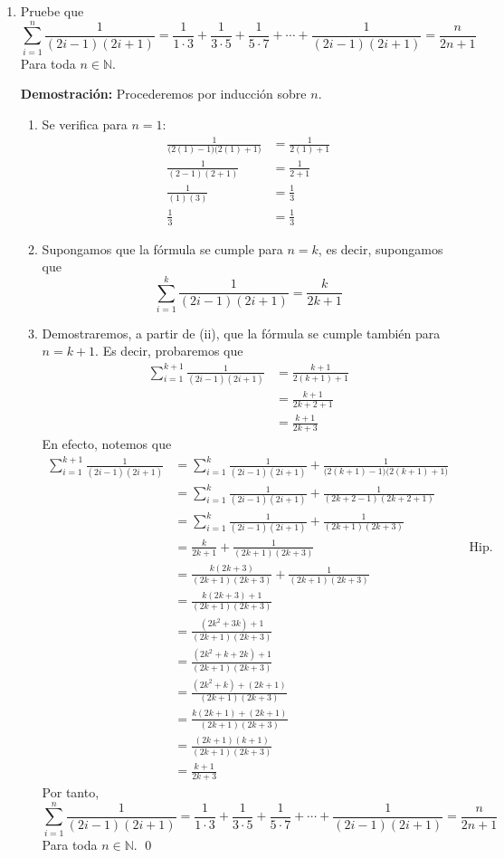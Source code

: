 \documentclass[11pt]{article}
\newcommand{\N}{\mathbb{N}}
\begin{document}
\begin{enumerate}
 \item Pruebe que \[ \sum_{i=1}^n \frac{1}{(2i-1)(2i+1)} = \frac{1}{1\cdot 3}+\frac{1}{3\cdot 5}+\frac{1}{5\cdot 7} + \cdots + \frac{1}{(2i-1)(2i+1)} = \frac{n}{2n+1}
  \] Para toda $n\in \N$.

  \textbf{Demostración:} Procederemos por inducción sobre $n$. \begin{enumerate}[label=\roman*)]
   \item Se verifica para $n=1$: \begin{align*}
   \frac{1}{\bigl(2(1)-1\bigr)\bigl(2(1)+1\bigr)} &= \frac{1}{2(1)+1}\\
   \frac{1}{(2-1)(2+1)} &=  \frac{1}{2+1}\\
   \frac{1}{(1)(3)} &= \frac{1}{3} \\
   \frac{1}{3} &= \frac{1}{3}
   \end{align*}
   \item Supongamos que la fórmula se cumple para $n=k$, es decir, supongamos que \[
    \sum_{i=1}^k \frac{1}{(2i-1)(2i+1)} = \frac{k}{2k+1}
    \]
   \item Demostraremos, a partir de (ii), que la fórmula se cumple también para $n=k+1$. Es decir, probaremos que \begin{align*}
    \sum_{i=1}^{k+1}\frac{1}{(2i-1)(2i+1)} &= \frac{k+1}{2(k+1)+1}\\
    &= \frac{k+1}{2k+2+1}\\
    &= \frac{k+1}{2k+3}
   \end{align*}
   En efecto, notemos que \begin{align*}
    \sum_{i=1}^{k+1}\frac{1}{(2i-1)(2i+1)} &= \sum_{i=1}^k \frac{1}{(2i-1)(2i+1)} + \frac{1}{\bigl(2(k+1)-1\bigr)\bigl(2(k+1)+1\bigr)}\\
    &= \sum_{i=1}^k \frac{1}{(2i-1)(2i+1)} + \frac{1}{(2k+2-1)(2k+2+1)} \\
    &= \sum_{i=1}^k \frac{1}{(2i-1)(2i+1)} + \frac{1}{(2k+1)(2k+3)} \\
    &= \frac{k}{2k+1} + \frac{1}{(2k+1)(2k+3)} && \text{Hip. Ind.} \\
    &= \frac{k(2k+3)}{(2k+1)(2k+3)} + \frac{1}{(2k+1)(2k+3)} \\
    &= \frac{k(2k+3)+1}{(2k+1)(2k+3)} \\
    &= \frac{(2k^2+3k)+1}{(2k+1)(2k+3)} \\
    &= \frac{(2k^2+k+2k)+1}{(2k+1)(2k+3)} \\
    &= \frac{(2k^2+k)+(2k+1)}{(2k+1)(2k+3)} \\
    &= \frac{k(2k+1)+(2k+1)}{(2k+1)(2k+3)} \\
    &= \frac{(2k+1)(k+1)}{(2k+1)(2k+3)} \\
    &= \frac{k+1}{2k+3}
   \end{align*}
   Por tanto, \[ \sum_{i=1}^n \frac{1}{(2i-1)(2i+1)} = \frac{1}{1\cdot 3}+\frac{1}{3\cdot 5}+\frac{1}{5\cdot 7} + \cdots + \frac{1}{(2i-1)(2i+1)} = \frac{n}{2n+1}
  \] Para toda $n\in \N$. \qed
  \end{enumerate}


\end{enumerate}
\end{document}
